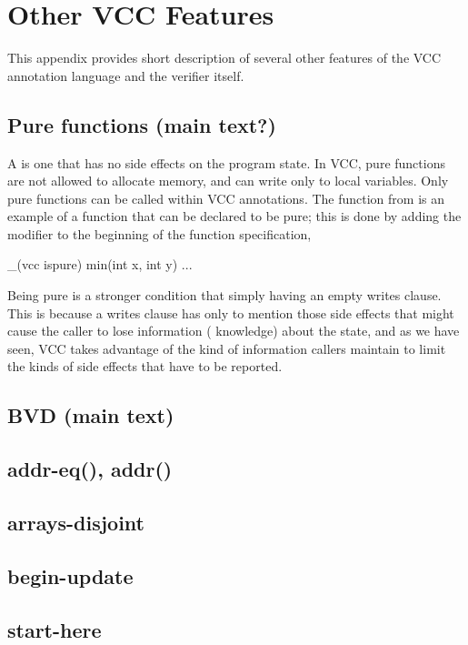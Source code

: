 \section{Other VCC Features}

This appendix provides short description of several other
features of the VCC annotation language and the verifier itself.

\subsection{Pure functions (main text?)}
\label{sect:pureFunctions}
A  is one that has no side effects on the program
state. In VCC, pure functions are not allowed to allocate memory, and can
write only to local variables. Only pure functions can be called within VCC
annotations. The function  from  is an
example of a function that can be declared to be pure; this is done by
adding the modifier  to the beginning of the function specification,
\eg
\begin{VCC}
_(vcc ispure) min(int x, int y) ...
\end{VCC}

Being pure is a stronger condition that simply having an empty writes
clause. This is because a writes clause has only to mention those side
effects that might cause the caller to lose information (\ie
knowledge) about the state, and as we have seen, VCC takes advantage
of the kind of information callers maintain to limit the kinds of side
effects that have to be reported.

\subsection{BVD (main text)}
\subsection{addr-eq(), addr()}
\subsection{arrays-disjoint}
\subsection{begin-update}
\subsection{start-here}
